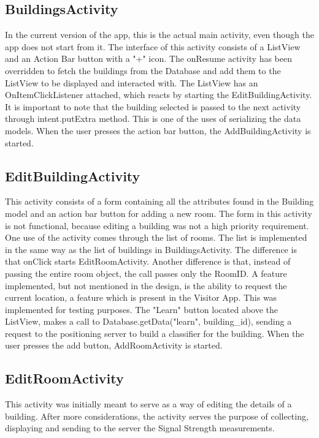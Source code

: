 \subsection{BuildingsActivity}
In the current version of the app, this is the actual main activity, even though the app does not start from it.
The interface of this activity consists of a ListView and an Action Bar button with a "+" icon. 
The onResume activity has been overridden to fetch the buildings from the Database and add them to the ListView to be displayed and interacted with. The ListView has an OnItemClickListener attached, which reacts by starting the EditBuildingActivity. It is important to note that the building selected is passed to the next activity through intent.putExtra method. This is one of the uses of serializing the data models. When the user presses the action bar button, the AddBuildingActivity is started.

\subsection{EditBuildingActivity}
This activity consists of a form containing all the attributes found in the Building model and an action bar button for adding a new room. The form in this activity is not functional, because editing a building was not a high priority requirement. 
One use of the activity comes through the list of rooms. The list is implemented in the same way as the list of buildings in BuildingsActivity. The difference is that onClick starts EditRoomActivity. Another difference is that, instead of passing the entire room object, the call passes only the RoomID. A feature implemented, but not mentioned in the design, is the ability to request the current location, a feature which is present in the Visitor App. This was implemented for testing purposes.
The "Learn" button located above the ListView, makes a call to Database.getData("learn", building\_id), sending a request to the positioning server to build a classifier for the building.
When the user presses the add button, AddRoomActivity is started.

\subsection{EditRoomActivity}
This activity was initially meant to serve as a way of editing the details of a building. After more considerations, the activity serves the purpose of collecting, displaying and sending to the server the Signal Strength measurements. 

